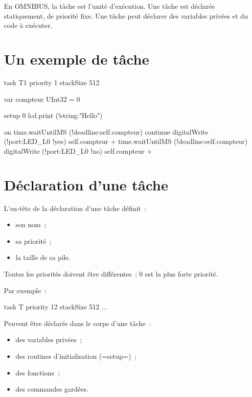 





En OMNIBUS, la tâche est l'unité d'exécution. Une tâche est déclarée statiquement, de priorité fixe. Une tâche peut déclarer des variables privées et du code à exécuter.


\section{Un exemple de tâche}


\begin{OMNIBUS}
task T1 priority 1 stackSize 512 {
  var compteur UInt32 = 0

  setup 0 {
    lcd.print (!string:"Hello")
  }

  on time.waitUntilMS (!deadline:self.compteur) continue {
    digitalWrite (!port:LED_L0 !yes)
    self.compteur +%
    time.waitUntilMS (!deadline:self.compteur)
    digitalWrite (!port:LED_L0 !no)
    self.compteur +%
  }
}
\end{OMNIBUS}

\section{Déclaration d'une tâche}

L'en-tête de la déclaration d'une tâche définit~:
\begin{itemize}
  \item son nom~;
  \item sa priorité~;
  \item la taille de sa pile.
\end{itemize}

Toutes les priorités doivent être différentes~; $0$ est la plus forte priorité.

Par exemple~:
\begin{OMNIBUS}
task T priority 12 stackSize 512 {
  ...
}
\end{OMNIBUS}

Peuvent être déclarés dans le corps d'une tâche~:
\begin{itemize}
  \item des variables privées~;
  \item des routines d'initialisation (\omnibus=setup=)~;
  \item des fonctions~;
  \item des commandes gardées.
\end{itemize}


